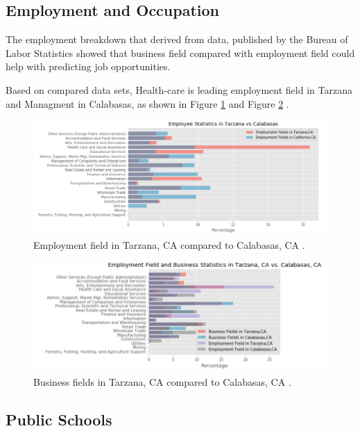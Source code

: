 \documentclass[sigconf]{acmart}
\begin{document}
\subsection{Employment and Occupation}

The employment breakdown that derived from data, published by the Bureau of Labor Statistics showed that business field compared with employment field could help with predicting job opportunities.

Based on compared data sets, Health-care is leading employment field in Tarzana and Managment in Calabasas, as shown in Figure \ref{fig:figure8} and Figure \ref{fig:figure9} \cite{md}.

\begin{figure}
  \centering
  \includegraphics[width=1.0\columnwidth]{images/figure8.png}
  \caption{Employment field in Tarzana, CA compared to Calabasas, CA \cite{md}.} \label{fig:figure8} 
\end{figure}

\begin{figure}
  \centering
  \includegraphics[width=1.0\columnwidth]{images/figure9.png}
  \caption{Business fields in Tarzana, CA compared to Calabasas, CA \cite{md}.} \label{fig:figure9} 
\end{figure}

\subsection{Public Schools}
\end{document}
